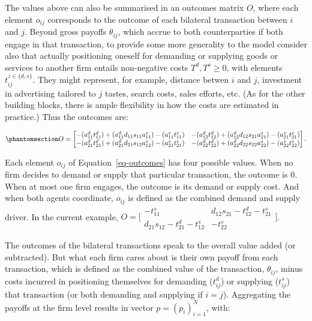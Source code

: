 \documentclass[
]{article}
\theoremstyle{plain}
\theoremstyle{definition}
\theoremstyle{remark}
\begin{document}
The values above can also be summarised in an outcomes matrix \(O\),
where each element \(o_{ij}\) corresponds to the outcome of each
bilateral transaction between \(i\) and \(j\). Beyond gross payoffs
\(\theta_{ij}\), which accrue to both counterparties if both engage in
that transaction, to provide some more generality to the model consider
also that actually positioning oneself for demanding or supplying goods
or services to another firm entails non-negative costs
\(T^d, T^s \geq 0\), with elements \(t_{ij}^{z \in \{d, s\}}\). They
might represent, for example, distance betwen \(i\) and \(j\),
investment in advertising tailored to \(j\) tastes, search costs, sales
efforts, etc. (As for the other building blocks, there is ample
flexibility in how the costs are estimated in practice.) Thus the
outcomes are:

\begin{equation}\phantomsection\label{eq-outcomes}{
O = 
\begin{bmatrix}
-(a_{11}^d t_{11}^d) + (a_{11}^d d_{11} s_{11} a_{11}^s) - (a_{11}^s t_{11}^s) & -(a_{12}^d t_{12}^d) + (a_{12}^d d_{12} s_{21} a_{21}^s) - (a_{21}^s t_{21}^s)\\
-(a_{21}^d t_{21}^d) + (a_{21}^d d_{21} s_{12} a_{12}^s) - (a_{21}^s t_{21}^s) & -(a_{22}^d t_{22}^d) + (a_{22}^d d_{22} s_{22} a_{22}^s) - (a_{22}^s t_{22}^s)
\end{bmatrix}.
}\end{equation}

Each element \(o_{ij}\) of Equation~\ref{eq-outcomes} has four possible
values. When no firm decides to demand or supply that particular
transaction, the outcome is \(0\). When at most one firm engages, the
outcome is its demand or supply cost. And when both agents coordinate,
\(o_{ij}\) is defined as the combined demand and supply driver. In the
current example, \(O=\big[\begin{smallmatrix}
-t_{11}^s & d_{12} s_{21} - t_{12}^d - t_{21}^s \\
d_{21} s_{12} -t_{21}^d - t_{12}^s & - t_{22}^s
\end{smallmatrix}\big]\).

The outcomes of the bilateral transactions speak to the overall value
added (or subtracted). But what each firm cares about is their own
payoff from each transaction, which is defined as the combined value of
the transaction, \(\theta_{ij}\), minus costs incurred in positioning
themselves for demanding (\(t_{ij}^d\)) or supplying (\(t_{ij}^s\)) that
transaction (or both demanding and supplying if \(i=j\)). Aggregating
the payoffs at the firm level results in vector \(p = (p_i)_{i=1}^N\),
with:
\end{document}

